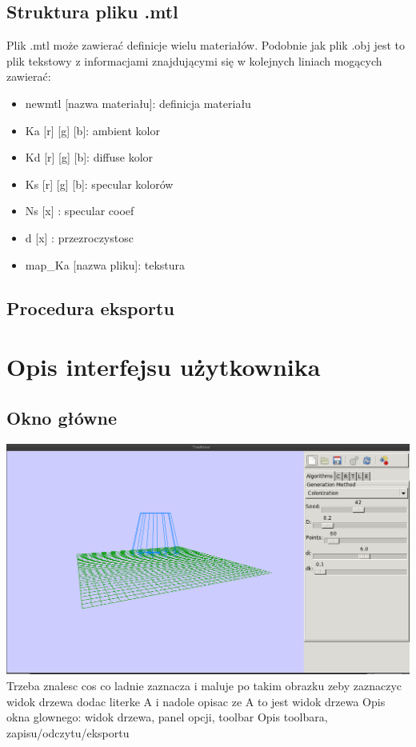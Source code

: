 \subsection{Struktura pliku .mtl}
Plik .mtl może zawierać definicje wielu materiałów. Podobnie jak plik .obj jest to plik tekstowy z informacjami znajdującymi
się w kolejnych liniach mogących zawierać:
\begin{itemize}
\item newmtl [nazwa materiału]: definicja materiału
\item Ka [r] [g] [b]: ambient kolor
\item Kd [r] [g] [b]: diffuse kolor
\item Ks [r] [g] [b]: specular kolorów
\item Ns [x]        : specular cooef
\item d  [x]        : przezroczystosc
\item map\_Ka [nazwa pliku]: tekstura 
\end{itemize}
\subsection{Procedura eksportu}

\section{Opis interfejsu użytkownika}
\subsection{Okno główne}
{\includegraphics[width=140mm]{images/gui/mainWindow.png}}\\
\vspace{5mm}
Trzeba znalesc cos co ladnie zaznacza i maluje po takim obrazku zeby zaznaczyc widok drzewa dodac literke A i nadole opisac ze A to jest widok drzewa
Opis okna glownego: widok drzewa, panel opcji, toolbar
Opis toolbara, zapisu/odczytu/eksportu

